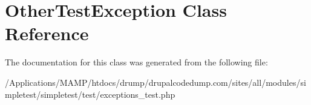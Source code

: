 \hypertarget{class_other_test_exception}{
\section{OtherTestException Class Reference}
\label{class_other_test_exception}
}


The documentation for this class was generated from the following file:\begin{DoxyCompactItemize}
\item 
/Applications/MAMP/htdocs/drump/drupalcodedump.com/sites/all/modules/simpletest/simpletest/test/exceptions\_\-test.php\end{DoxyCompactItemize}
